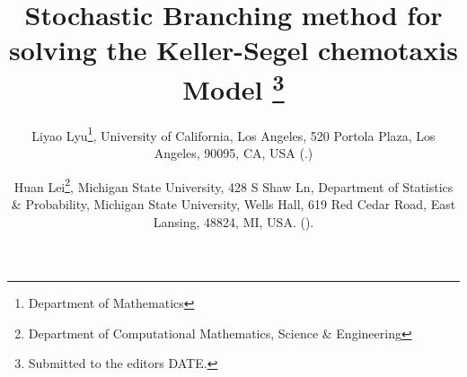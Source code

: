 

\usepackage{lipsum}
\usepackage{amsfonts}
\usepackage{graphicx}
\usepackage{epstopdf}
\ifpdf
\else
\fi

\newcommand{\creflastconjunction}{, and~}



\title{Stochastic Branching method for solving the Keller-Segel chemotaxis Model
\thanks{Submitted to the editors DATE.
}
}

\author{Liyao Lyu\thanks{Department of Mathematics}, {University of California, Los Angeles}, {520 Portola Plaza}, {Los Angeles}, 90095, CA, USA
  (.)
\and Huan Lei\thanks{Department of Computational Mathematics, Science \& Engineering}, {Michigan State University}, {{428 S Shaw Ln}, 
Department of Statistics \& Probability}, Michigan State University, Wells Hall, 619 Red Cedar Road, {East Lansing}, {48824}, {MI}, {USA}.
  ().}


\usepackage{amsopn}
\DeclareMathOperator{\diag}{diag}





